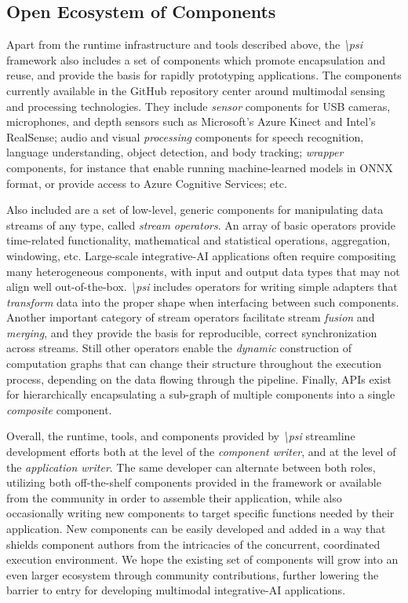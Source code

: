 \documentclass[letterpaper]{article} %
\newcommand{\psif}{\emph{\textbackslash psi} }
\begin{document}
\subsection{Open Ecosystem of Components}

Apart from the runtime infrastructure and tools described above, the \psif framework also includes a set of components which promote encapsulation and reuse, and provide the basis for rapidly prototyping applications. The components currently available in the GitHub repository center around multimodal sensing and processing technologies. They include \emph{sensor} components for USB cameras, microphones, and depth sensors such as Microsoft's Azure Kinect and Intel's RealSense; audio and visual \emph{processing} components for speech recognition, language understanding, object detection, and body tracking; \emph{wrapper} components, for instance that enable running machine-learned models in ONNX format, or provide access to Azure Cognitive Services; etc.

Also included are a set of low-level, generic components for manipulating data streams of any type, called \emph{stream operators}. An array of basic operators provide time-related functionality, mathematical and statistical operations, aggregation, windowing, etc. Large-scale integrative-AI applications often require compositing many heterogeneous components, with input and output data types that may not align well out-of-the-box. \psif includes operators for writing simple adapters that \emph{transform} data into the proper shape when interfacing between such components. Another important category of stream operators facilitate stream \emph{fusion} and \emph{merging}, and they provide the basis for reproducible, correct synchronization across streams. Still other operators enable the \emph{dynamic} construction of computation graphs that can change their structure throughout the execution process, depending on the data flowing through the pipeline. Finally, APIs exist for hierarchically encapsulating a sub-graph of multiple components into a single \emph{composite} component.

Overall, the runtime, tools, and components provided by \psif streamline development efforts both at the level of the \emph{component writer}, and at the level of the \emph{application writer}. The same developer can alternate between both roles, utilizing both off-the-shelf components provided in the framework or available from the community in order to assemble their application, while also occasionally writing new components to target specific functions needed by their application. New components can be easily developed and added in a way that shields component authors from the intricacies of the concurrent, coordinated execution environment. We hope the existing set of components will grow into an even larger ecosystem through community contributions, further lowering the barrier to entry for developing multimodal integrative-AI applications.
\end{document}
